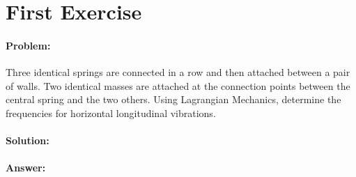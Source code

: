 \section{First Exercise}
\paragraph{Problem:} Three identical springs are connected in a row and then attached between a pair of walls. Two identical masses are attached at the connection points between the central spring and the two others. Using Lagrangian Mechanics, determine the frequencies for horizontal longitudinal vibrations.

\paragraph{Solution:} 

\paragraph{Answer:}